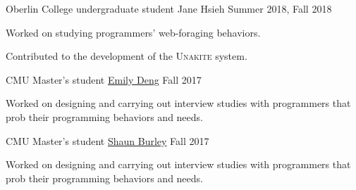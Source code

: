 
\begin{cventries}
  \cventry
    {Oberlin College undergraduate student} %
    {Jane Hsieh} %
    {Summer 2018, Fall 2018} %
    {} %
    {
      \begin{cvitems} %
        \item {Worked on studying programmers' web-foraging behaviors.}
        \item {Contributed to the development of the \textsc{Unakite} system.}
      \end{cvitems}
    }

  \cventry
    {CMU Master's student} %
    {\href{https://emilywdeng.com/}{Emily Deng}} %
    {Fall 2017} %
    {} %
    {
      \begin{cvitems} %
        \item {Worked on designing and carrying out interview studies with programmers that prob their programming behaviors and needs.}
      \end{cvitems}
    }

  \cventry
    {CMU Master's student} %
    {\href{http://www.shaunburley.com/}{Shaun Burley}} %
    {Fall 2017} %
    {} %
    {
      \begin{cvitems} %
        \item {Worked on designing and carrying out interview studies with programmers that prob their programming behaviors and needs.}
      \end{cvitems}
    }

\end{cventries}